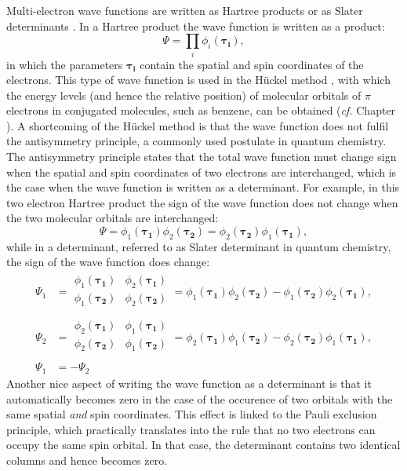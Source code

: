 Multi-electron wave functions are written as Hartree products \cite{hartree1,hartree2,hartree3} or as Slater determinants \cite{slater}. In a Hartree product the wave function is written as a product:
\begin{equation}
\Psi=\prod_i \phi_i(\mathbf{\tau_i}),
\end{equation}
in which the parameters $\mathbf{\tau_i}$ contain the spatial and spin coordinates of the electrons. This type of wave function is used in the H\"uckel method \cite{huckel1,huckel2,huckel3}, with which the energy levels (and hence the relative position) of molecular orbitals of $\pi$ electrons in conjugated molecules, such as benzene, can be obtained (\textit{cf.} Chapter \chhuckel). A shortcoming of the H\"uckel method is that the wave function does not fulfil the antisymmetry principle, a commonly used postulate in quantum chemistry. The antisymmetry principle states that the total wave function must change sign when the spatial and spin coordinates of two electrons are interchanged, which is the case when the wave function is written as a determinant. For example, in this two electron Hartree product the sign of the wave function does not change when the two molecular orbitals are interchanged:
\begin{equation}
\Psi=\phi_1(\mathbf{\tau_1})\phi_2(\mathbf{\tau_2}) = \phi_2(\mathbf{\tau_2})\phi_1(\mathbf{\tau_1}),
\end{equation}
while in a determinant, referred to as Slater determinant in quantum chemistry, the sign of the wave function does change:
\begin{equation}
\begin{split}
\Psi_1 &=
\begin{array}{|cc|}
\phi_1(\mathbf{\tau_1}) & \phi_2(\mathbf{\tau_1}) \\
\phi_1(\mathbf{\tau_2}) & \phi_2(\mathbf{\tau_2}) \\
\end{array}
= \phi_1(\mathbf{\tau_1})\phi_2(\mathbf{\tau_2}) - \phi_1(\mathbf{\tau_2})\phi_2(\mathbf{\tau_1}), \\
\Psi_2 &=
\begin{array}{|cc|}
\phi_2(\mathbf{\tau_1}) & \phi_1(\mathbf{\tau_1}) \\
\phi_2(\mathbf{\tau_2}) & \phi_1(\mathbf{\tau_2}) \\
\end{array}
= \phi_2(\mathbf{\tau_1})\phi_1(\mathbf{\tau_2}) - \phi_2(\mathbf{\tau_2})\phi_1(\mathbf{\tau_1}), \\
\Psi_1 &= - \Psi_2
\end{split}
\end{equation}
Another nice aspect of writing the wave function as a determinant is that it automatically becomes zero in the case of the occurence of two orbitals with the same spatial \textit{and} spin coordinates. This effect is linked to the Pauli exclusion principle, which practically translates into the rule that no two electrons can occupy the same spin orbital. In that case, the determinant contains two identical columns and hence becomes zero.

